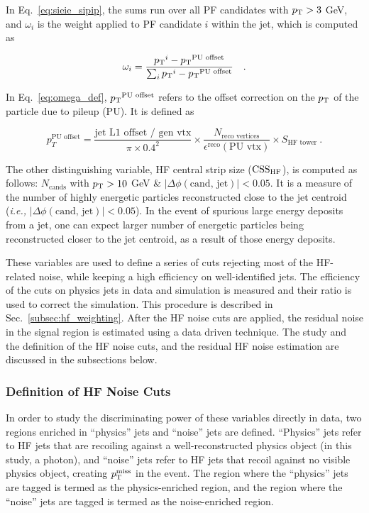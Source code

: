 In Eq.~\ref{eq:sieie_sipip}, the sums run over all PF candidates with $p_{\textrm{T}} > 3$ GeV, and 
$\omega_i$ is the weight applied to PF candidate $i$ within the jet, which is computed as

\begin{equation}
    \omega_i = \frac{{p_{\textrm{T}}}^i - {p_{\textrm{T}}}^{\text{PU offset}}}{\sum_{i} {p_{\textrm{T}}}^{i} - {p_{\textrm{T}}}^{\text{PU offset}} } \quad .
    \label{eq:omega_def}
\end{equation}

In Eq.~\ref{eq:omega_def}, ${p_{\textrm{T}}}^{\text{PU offset}}$ refers to the offset correction on the $p_{\textrm{T}}$ of the particle 
due to pileup (PU). It is defined as

\begin{equation}
    p_T^{\text{PU offset}} = \frac{\text{jet L1 offset / gen vtx}}{\pi \times 0.4^2} \times \frac{N_{\text{reco vertices}}}{\epsilon^{\text{reco}}(\text{PU vtx})} \times S_{\text{HF tower}} \ .
\end{equation}

The other distinguishing variable, HF central strip size ($\mathrm{CSS_{HF}}$), is computed as follows: 
$N_{\textrm{cands}}$ with $p_{\textrm{T}} > 10$ GeV \& $|\Delta\phi(\textrm{cand, jet})| < 0.05$. It is a measure of the number of
highly energetic particles reconstructed close to the jet centroid (\textit{i.e.,} $|\Delta\phi(\textrm{cand, jet})| < 0.05$).
In the event of spurious large energy deposits from a jet, one can expect larger number of energetic particles
being reconstructed closer to the jet centroid, as a result of those energy deposits.

These variables are used to define a series of cuts rejecting most of the HF-related noise, while keeping a high efficiency on well-identified jets. 
The efficiency of the cuts on physics jets in data and simulation is measured and their ratio is used to correct the simulation.
This procedure is described in Sec.~\ref{subsec:hf_weighting}. After the HF noise cuts are applied, the residual noise in the signal region is estimated using a data driven technique.
The study and the definition of the HF noise cuts, and the residual HF noise estimation are discussed in the subsections below. 

\subsubsection{Definition of HF Noise Cuts}

In order to study the discriminating power of these variables directly in data, two regions enriched in ``physics'' jets and ``noise'' jets are defined. ``Physics'' jets
refer to HF jets that are recoiling against a well-reconstructed physics object (in this study, a photon), and ``noise'' jets 
refer to HF jets that recoil against no visible physics object, creating $p_{\textrm{T}}^{\textrm{miss}}$ in the event. The region where the ``physics'' jets are tagged
is termed as the physics-enriched region, and the region where the ``noise'' jets are tagged is termed as the noise-enriched region.

